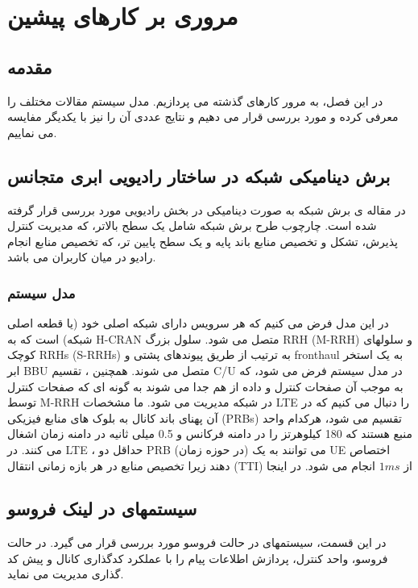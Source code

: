 \chapter{مروری بر کارهای پیشین}

\section{مقدمه}
در این فصل، به مرور کارهای گذشته می پردازیم.
مدل سیستم مقالات مختلف را معرفی کرده و مورد بررسی قرار می دهیم و نتایج عددی آن را نیز با یکدیگر مفایسه می نماییم.
\section{برش دینامیکی شبکه در ساختار رادیویی ابری متجانس}
در مقاله ی \cite{lee2018dynamic}
برش شبکه به صورت دینامیکی در بخش رادیویی مورد بررسی قرار گرفته شده است.
چارچوب طرح برش شبکه شامل یک سطح بالاتر، که مدیریت کنترل پذیرش، تشکل و تخصیص منابع باند پایه و یک سطح پایین تر، که تخصیص منابع انجام رادیو در میان کاربران می باشد.
\subsection{مدل سیستم}
در این مدل فرض می کنیم که هر سرویس دارای شبکه اصلی خود (یا قطعه اصلی شبکه) است که به H-CRAN متصل می شود.
سلول بزرگ RRH (M-RRH) و سلولهای کوچک RRHs (S-RRHs) به ترتیب از طریق پیوندهای پشتی و fronthaul به یک استخر ابر
BBU  متصل می شوند.
همچنین ، تقسیم C/U در مدل سیستم فرض می شود، که به موجب آن صفحات کنترل و داده از هم جدا می شوند به گونه ای که صفحات کنترل توسط M-RRH در شبکه مدیریت می شود.
ما مشخصات LTE را دنبال می کنیم که در آن پهنای باند کانال به بلوک های منابع فیزیکی (PRBs) تقسیم می شود، هرکدام واحد منبع هستند که 180 کیلوهرتز را در دامنه فرکانس و 0.5 میلی ثانیه در دامنه زمان اشغال می کنند.
در LTE ، حداقل دو PRB (در حوزه زمان) می توانند به یک UE اختصاص دهند زیرا تخصیص منابع در هر بازه زمانی انتقال (TTI) از
$1ms$
 انجام می شود.
 در اینجا 
 \section{ سیستمهای   در لینک فروسو }
در این قسمت، سیستمهای   در حالت فروسو مورد بررسی قرار می گیرد. در حالت فروسو،  واحد کنترل، پردازش اطلاعات پیام را با عملکرد کدگذاری کانال و پیش کد گذاری  مدیریت می نماید.
